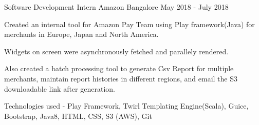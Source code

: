 \begin{cventries}
  \cventry
    {Software Development Intern}
    {Amazon }
    {Bangalore}
    {May 2018 - July 2018}
    {
      \begin{cvitems}
        \item Created an internal tool for Amazon Pay Team using Play framework(Java) for merchants in Europe, Japan and North America.
        \item {Widgets on screen were asynchronously fetched and parallely rendered.}
        \item {Also created a batch processing tool to generate Csv Report for multiple merchants, maintain report histories in different regions, and email the S3 downloadable link after generation.}
        \item {Technologies used - Play Framework, Twirl Templating Engine(Scala), Guice, Bootstrap, Java8, HTML, CSS, S3 (AWS), Git}
      \end{cvitems}
    }
 
\end{cventries}
